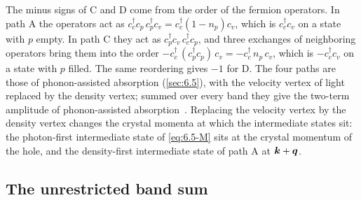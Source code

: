 The minus signs of C and D come from the order of the fermion operators. In path A the operators act as $c^\dagger_cc_p\,c^\dagger_pc_v = c^\dagger_c(1 - n_p)c_v$, which is $c^\dagger_cc_v$ on a state with $p$ empty. In path C they act as $c^\dagger_pc_v\,c^\dagger_cc_p$, and three exchanges of neighboring operators bring them into the order $-c^\dagger_c\,(c^\dagger_pc_p)\,c_v = -c^\dagger_c\,n_p\,c_v$, which is $-c^\dagger_cc_v$ on a state with $p$ filled. The same reordering gives $-1$ for D. The four paths are those of phonon-assisted absorption (\cref{sec:6.5}), with the velocity vertex of light replaced by the density vertex; summed over every band they give the two-term amplitude of phonon-assisted absorption~\cites[Eq.~(200)]{giustino2017electron}[Eqs.~(2) and~(3)]{noffsinger2012phonon}. Replacing the velocity vertex by the density vertex changes the crystal momenta at which the intermediate states sit: the photon-first intermediate state of \cref{eq:6.5-M} sits at the crystal momentum of the hole, and the density-first intermediate state of path A at $\bm{k}+\bm{q}$.

\subsection{The unrestricted band sum}

